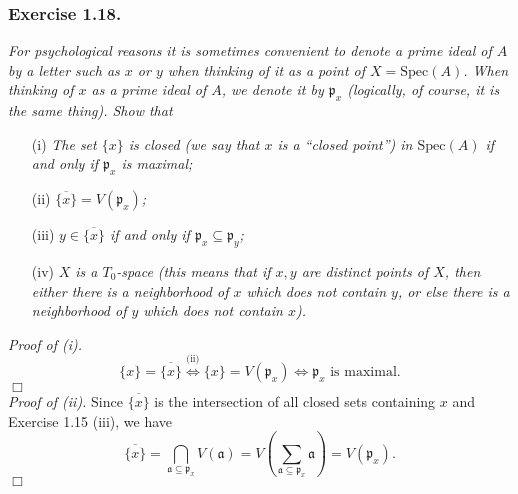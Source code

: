 \documentclass{article}
\begin{document}



\subsubsection*{Exercise 1.18.}
\emph{For psychological reasons it is sometimes convenient to denote a prime ideal of $A$ by
a letter such as $x$ or $y$ when thinking of it as a point of $X = \mathrm{Spec}(A)$.
When thinking of $x$ as a prime ideal of $A$, we denote it by $\mathfrak{p}_x$
(logically, of course, it is the same thing).
Show that}
\begin{enumerate}
\item[(i)]
  \emph{The set $\{x\}$ is closed
  (we say that $x$ is a ``closed point'') in $\mathrm{Spec}(A)$ if and only if $\mathfrak{p}_x$ is maximal;}

\item[(ii)]
  \emph{$\overline{\{x\}} = V(\mathfrak{p}_x)$;}

\item[(iii)]
  \emph{$y \in \overline{\{x\}}$ if and only if $\mathfrak{p}_x \subseteq \mathfrak{p}_y$;}

\item[(iv)]
  \emph{$X$ is a $T_0$-space
  (this means that if $x, y$ are distinct points of $X$,
  then either there is a neighborhood of $x$ which does not contain $y$,
  or else there is a neighborhood of $y$ which does not contain $x$).} \\
\end{enumerate}



\emph{Proof of (i).}
  \[
    \{x\} = \overline{\{x\}}
    \stackrel{\text{(ii)}}{\Longleftrightarrow}
    \{x\} = V(\mathfrak{p}_x)
    \Longleftrightarrow
    \text{$\mathfrak{p}_x$ is maximal}.
  \]
$\Box$ \\



\emph{Proof of (ii).}
  Since $\overline{\{x\}}$ is the intersection of all closed sets containing $x$ and Exercise 1.15 (iii),
  we have
  \[
    \overline{\{x\}}
    = \bigcap_{\mathfrak{a} \subseteq \mathfrak{p}_x} V(\mathfrak{a})
    = V\left( \sum_{\mathfrak{a} \subseteq \mathfrak{p}_x} \mathfrak{a} \right)
    = V(\mathfrak{p}_x).
  \]
$\Box$ \\
\end{document}
